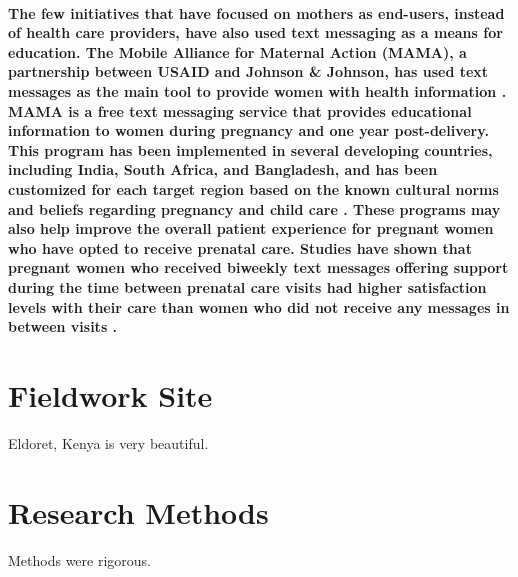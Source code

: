 \paragraph{The few initiatives that have focused on mothers as end-users, instead of health care providers, have also used text messaging as a means for education. The Mobile Alliance for Maternal Action (MAMA), a partnership between USAID and Johnson \& Johnson, has used text messages as the main tool to provide women with health information \citep{McCartney2012}. MAMA is a free text messaging service that provides educational information to women during pregnancy and one year post-delivery. This program has been implemented in several developing countries, including India, South Africa, and Bangladesh, and has been customized for each target region based on the known cultural norms and beliefs regarding pregnancy and child care \citep{McCartney2012}. These programs may also help improve the overall patient experience for pregnant women who have opted to receive prenatal care. Studies have shown that pregnant women who received biweekly text messages offering support during the time between prenatal care visits had higher satisfaction levels with their care than women who did not receive any messages in between visits \citep{Jareethum2008}.} 


\section{Fieldwork Site}
Eldoret, Kenya is very beautiful.

\section{Research Methods}
Methods were rigorous.